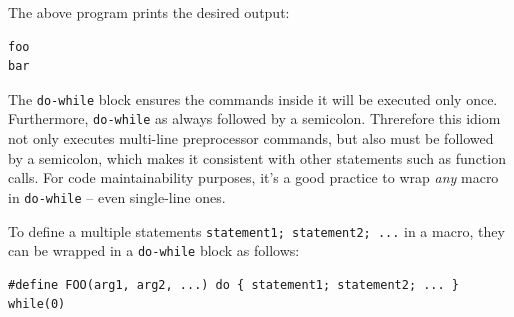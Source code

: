 The above program prints the desired output:
\begin{verbatim}
foo
bar
\end{verbatim}
The \texttt{do-while} block ensures the commands inside it will be executed only once. Furthermore, \texttt{do-while} as always followed by a semicolon. Threrefore this idiom not only executes multi-line preprocessor commands, but also must be followed by a semicolon, which makes it consistent with other statements such as function calls. For code maintainability purposes, it's a good practice to wrap \textit{any} macro in \texttt{do-while} -- even single-line ones.
\begin{takeaway}
To define a multiple statements \texttt{statement1; statement2; ...} in a macro, they can be wrapped in a \texttt{do-while} block as follows:
\begin{verbatim}
#define FOO(arg1, arg2, ...) do { statement1; statement2; ... } while(0)
\end{verbatim}
\end{takeaway}